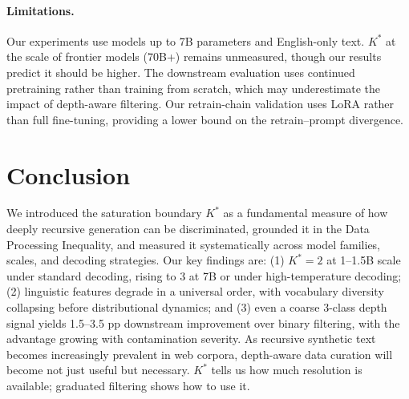 \documentclass[11pt,a4paper]{article}
\begin{document}
\paragraph{Limitations.}
Our experiments use models up to 7B parameters and English-only text. $K^*$ at the scale of frontier models (70B+) remains unmeasured, though our results predict it should be higher. The downstream evaluation uses continued pretraining rather than training from scratch, which may underestimate the impact of depth-aware filtering. Our retrain-chain validation uses LoRA rather than full fine-tuning, providing a lower bound on the retrain--prompt divergence.

\section{Conclusion}
\label{sec:conclusion}

We introduced the saturation boundary $K^*$ as a fundamental measure of how deeply recursive generation can be discriminated, grounded it in the Data Processing Inequality, and measured it systematically across model families, scales, and decoding strategies. Our key findings are: (1) $K^*{=}2$ at 1--1.5B scale under standard decoding, rising to 3 at 7B or under high-temperature decoding; (2) linguistic features degrade in a universal order, with vocabulary diversity collapsing before distributional dynamics; and (3) even a coarse 3-class depth signal yields 1.5--3.5 pp downstream improvement over binary filtering, with the advantage growing with contamination severity. As recursive synthetic text becomes increasingly prevalent in web corpora, depth-aware data curation will become not just useful but necessary. $K^*$ tells us how much resolution is available; graduated filtering shows how to use it.


\end{document}
